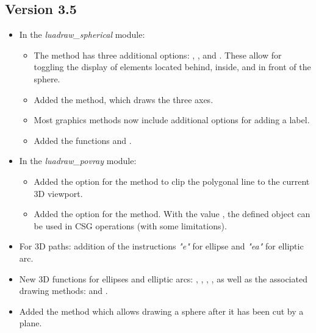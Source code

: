 \subsection{Version 3.5}

\begin{itemize}
    \item In the \emph{luadraw\_spherical} module:
    \begin{itemize}
        \item The  method has three additional options: , , and . These allow for toggling the display of elements located behind, inside, and in front of the sphere. 
        
        \item Added the  method, which draws the three axes. 
        
        \item Most graphics methods now include additional options for adding a label. 
        
        \item Added the functions  and . 
    \end{itemize}

    \item In the \emph{luadraw\_povray} module:
    \begin{itemize}
        \item Added the option  for the  method to clip the polygonal line to the current 3D viewport.

        \item Added the option  for the  method. With the value \true, the defined object can be used in CSG operations (with some limitations).
    \end{itemize}

    \item For 3D paths: addition of the instructions \emph{"e"} for ellipse and \emph{"ea"} for elliptic arc.

    \item New 3D functions for ellipses and elliptic arcs: , , , , as well as the associated drawing methods:  and .
    
    \item Added the method  which allows drawing a sphere after it has been cut by a plane.
    

\end{itemize}
